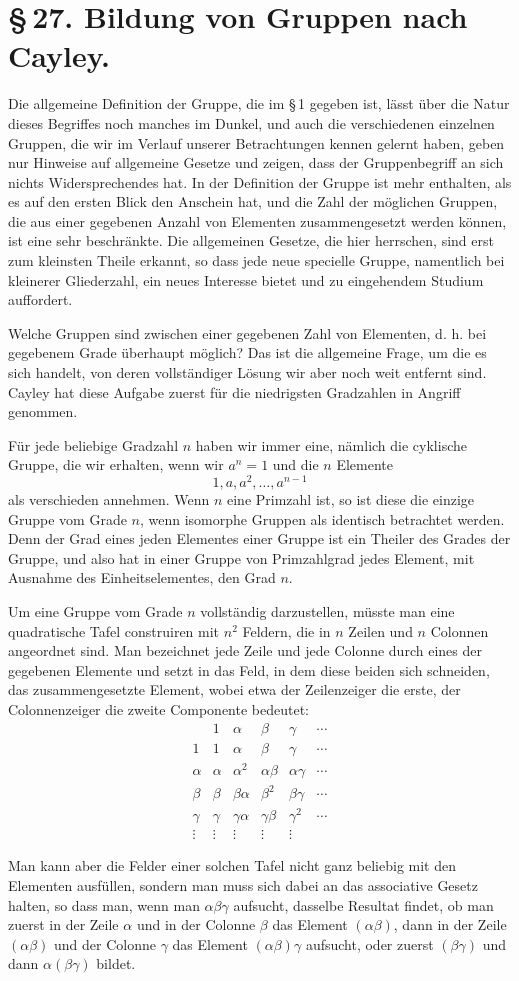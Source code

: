 \documentclass[11pt]{article}
\newcommand{\generalCayleyTable}{%
\[
\begin{array}{c|ccccc}
 & 1 & \alpha & \beta & \gamma & \cdots\\\hline
1&1&\alpha&\beta&\gamma&\cdots\\
\alpha&\alpha&\alpha^2&\alpha\beta&\alpha\gamma&\cdots\\
\beta&\beta&\beta\alpha&\beta^2&\beta\gamma&\cdots\\
\gamma&\gamma&\gamma\alpha&\gamma\beta&\gamma^2&\cdots\\
\vdots&\vdots&\vdots&\vdots&\vdots&
\end{array}
\]
}
\begin{document}
\section*{\S\,27. Bildung von Gruppen nach Cayley.}

Die allgemeine Definition der Gruppe, die im \S\,1 gegeben ist, lässt über die Natur dieses Begriffes noch manches im Dunkel, und auch die verschiedenen einzelnen Gruppen, die wir im Verlauf unserer Betrachtungen kennen gelernt haben, geben nur Hinweise auf allgemeine Gesetze und zeigen, dass der Gruppenbegriff an sich nichts Widersprechendes hat. In der Definition der Gruppe ist mehr enthalten, als es auf den ersten Blick den Anschein hat, und die Zahl der möglichen Gruppen, die aus einer gegebenen Anzahl von Elementen zusammengesetzt werden können, ist eine sehr beschränkte. Die allgemeinen Gesetze, die hier herrschen, sind erst zum kleinsten Theile erkannt, so dass jede neue specielle Gruppe, namentlich bei kleinerer Gliederzahl, ein neues Interesse bietet und zu eingehendem Studium auffordert.

Welche Gruppen sind zwischen einer gegebenen Zahl von Elementen, d. h. bei gegebenem Grade überhaupt möglich? Das ist die allgemeine Frage, um die es sich handelt, von deren vollständiger Lösung wir aber noch weit entfernt sind. Cayley hat diese Aufgabe zuerst für die niedrigsten Gradzahlen in Angriff genommen.

Für jede beliebige Gradzahl $n$ haben wir immer eine, nämlich die cyklische Gruppe, die wir erhalten, wenn wir $a^n=1$ und die $n$ Elemente
\[
1, a, a^2,\ldots,a^{n-1}
\]
als verschieden annehmen. Wenn $n$ eine Primzahl ist, so ist diese die einzige Gruppe vom Grade $n$, wenn isomorphe Gruppen als identisch betrachtet werden. Denn der Grad eines jeden Elementes einer Gruppe ist ein Theiler des Grades der Gruppe, und also hat in einer Gruppe von Primzahlgrad jedes Element, mit Ausnahme des Einheitselementes, den Grad $n$.

Um eine Gruppe vom Grade $n$ vollständig darzustellen, müsste man eine quadratische Tafel construiren mit $n^2$ Feldern, die in $n$ Zeilen und $n$ Colonnen angeordnet sind. Man bezeichnet jede Zeile und jede Colonne durch eines der gegebenen Elemente und setzt in das Feld, in dem diese beiden sich schneiden, das zusammengesetzte Element, wobei etwa der Zeilenzeiger die erste, der Colonnenzeiger die zweite Componente bedeutet:
\generalCayleyTable
Man kann aber die Felder einer solchen Tafel nicht ganz beliebig mit den Elementen ausfüllen, sondern man muss sich dabei an das associative Gesetz halten, so dass man, wenn man $\alpha\beta\gamma$ aufsucht, dasselbe Resultat findet, ob man zuerst in der Zeile $\alpha$ und in der Colonne $\beta$ das Element $(\alpha\beta)$, dann in der Zeile $(\alpha\beta)$ und der Colonne $\gamma$ das Element $(\alpha\beta)\gamma$ aufsucht, oder zuerst $(\beta\gamma)$ und dann $\alpha(\beta\gamma)$ bildet.
\end{document}
